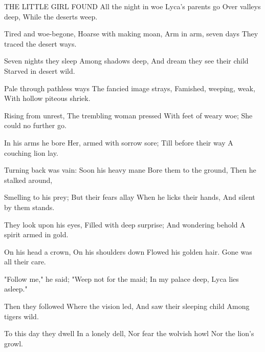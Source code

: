 THE LITTLE GIRL FOUND
   All the night in woe
   Lyca's parents go
   Over valleys deep,
   While the deserts weep.
   
   Tired and woe-begone,
   Hoarse with making moan,
   Arm in arm, seven days
   They traced the desert ways.
   
   Seven nights they sleep
   Among shadows deep,
   And dream they see their child
   Starved in desert wild.
   
   Pale through pathless ways
   The fancied image strays,
   Famished, weeping, weak,
   With hollow piteous shriek.
   
   Rising from unrest,
   The trembling woman pressed
   With feet of weary woe;
   She could no further go.
   
   In his arms he bore
   Her, armed with sorrow sore;
   Till before their way
   A couching lion lay.
   
   Turning back was vain:
   Soon his heavy mane
   Bore them to the ground,
   Then he stalked around,
   
   Smelling to his prey;
   But their fears allay
   When he licks their hands,
   And silent by them stands.
   
   They look upon his eyes,
   Filled with deep surprise;
   And wondering behold
   A spirit armed in gold.
   
   On his head a crown,
   On his shoulders down
   Flowed his golden hair.
   Gone was all their care.
   
   "Follow me," he said;
   "Weep not for the maid;
   In my palace deep,
   Lyca lies asleep."
   
   Then they followed
   Where the vision led,
   And saw their sleeping child
   Among tigers wild.
   
   To this day they dwell
   In a lonely dell,
   Nor fear the wolvish howl
   Nor the lion's growl.